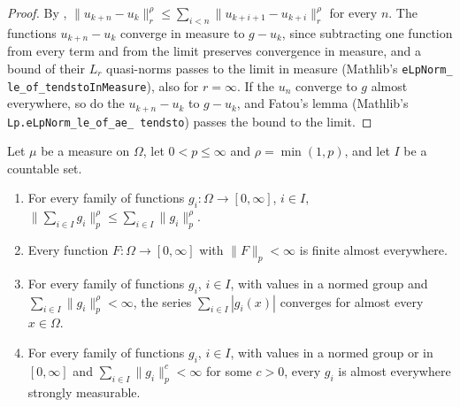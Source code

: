 \begin{proof}
\leanok
{}
By ,
$\|u_{k+n} - u_k\|_r^\rho \leq \sum_{i<n} \|u_{k+i+1} - u_{k+i}\|_r^\rho$ for every $n$. The
functions $u_{k+n} - u_k$ converge in measure to $g - u_k$, since subtracting one function from
every term and from the limit preserves convergence in measure, and a bound of their $L_r$
quasi-norms passes to the limit in measure (Mathlib's \texttt{eLpNorm\_\allowbreak
le\_\allowbreak of\_\allowbreak tendstoInMeasure}), also for $r = \infty$. If the $u_n$ converge
to $g$ almost everywhere, so do the $u_{k+n} - u_k$ to $g - u_k$, and Fatou's lemma (Mathlib's
\texttt{Lp.\allowbreak eLpNorm\_\allowbreak le\_\allowbreak of\_\allowbreak ae\_\allowbreak
tendsto}) passes the bound to the limit.
\end{proof}

\begin{lemma}[Series in $L_p$]
\label{lem:lp-series-every-exponent}
\leanok
Let $\mu$ be a measure on $\Omega$, let $0 < p \leq \infty$ and $\rho = \min(1, p)$, and let $I$
be a countable set.
\begin{enumerate}
  \item For every family of functions $g_i : \Omega \to [0, \infty]$, $i \in I$,
    $\bigl\| \sum_{i \in I} g_i \bigr\|_p^\rho \leq \sum_{i \in I} \|g_i\|_p^\rho$.
  \item Every function $F : \Omega \to [0, \infty]$ with $\|F\|_p < \infty$ is finite almost
    everywhere.
  \item For every family of functions $g_i$, $i \in I$, with values in a normed group and
    $\sum_{i \in I} \|g_i\|_p^\rho < \infty$, the series $\sum_{i \in I} |g_i(x)|$ converges for
    almost every $x \in \Omega$.
  \item For every family of functions $g_i$, $i \in I$, with values in a normed group or in
    $[0, \infty]$ and $\sum_{i \in I} \|g_i\|_p^c < \infty$ for some $c > 0$, every $g_i$ is
    almost everywhere strongly measurable.
\end{enumerate}
\end{lemma}

